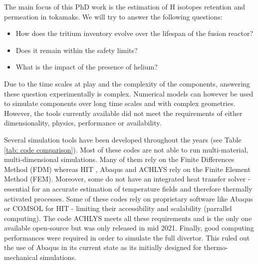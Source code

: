 The main focus of this PhD work is the estimation of H isotopes retention and permeation in tokamaks.
We will try to answer the following questions:
\begin{itemize}
    \item How does the tritium inventory evolve over the lifespan of the fusion reactor?
    \item Does it remain within the safety limits?
    \item What is the impact of the presence of helium?
\end{itemize}

Due to the time scales at play and the complexity of the components, answering these question experimentally is complex.
Numerical models can however be used to simulate components over long time scales and with complex geometries.
However, the tools currently available did not meet the requirements of either dimensionality, physics, performance or availability.

Several simulation tools have been developed throughout the years (see Table \ref{tab: code comparison}).
Most of these codes are not able to run multi-material, multi-dimensional simulations.
Many of them rely on the Finite Differences Method (FDM) whereas HIT , Abaqus  and ACHLYS  rely on the Finite Element Method (FEM).
Moreover, some do not have an integrated heat transfer solver - essential for an accurate estimation of temperature fields and therefore thermally activated processes.
Some of these codes rely on proprietary software like Abaqus or COMSOL for HIT - limiting their accessibility and scalability (parrallel computing).
The code ACHLYS meets all these requirements and is the only one available open-source but was only released in mid 2021.
Finally, good computing performances were required in order to simulate the full divertor.
This ruled out the use of Abaqus in its current state as its initially designed for thermo-mechanical simulations.

